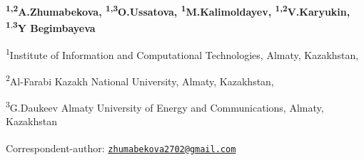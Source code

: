 
\begin{articleheader}

{\bfseries \textsuperscript{1,2}A.Zhumabekova\textsuperscript{\envelope },
\textsuperscript{1,3}O.Ussatova, \textsuperscript{1}M.Kalimoldayev,
\textsuperscript{1,2}V.Karyukin,
\textsuperscript{1}}\textsuperscript{,{\bfseries 3}}{\bfseries Y Begimbayeva}
\end{articleheader}

\begin{affiliation}
\textsuperscript{1}Institute of Information and Computational
Technologies, Almaty, Kazakhstan,

\textsuperscript{2}Al-Farabi Kazakh National University, Almaty,
Kazakhstan,

\textsuperscript{3}G.Daukeev Almaty University of Energy and
Communications, Almaty, Kazakhstan

\raggedright {\bfseries \textsuperscript{\envelope }}Correspondent-author: \href{mailto:zhumabekova2702@gmail.com}{\nolinkurl{zhumabekova2702@gmail.com}}
\end{affiliation}

